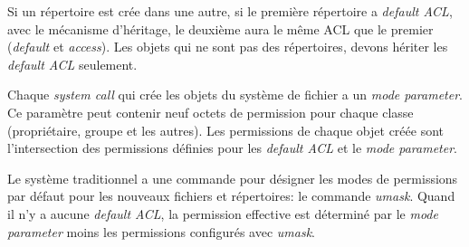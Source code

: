 Si un répertoire est crée dans une autre, si le première répertoire a \emph{default ACL}, avec le mécanisme d'héritage, le deuxième aura le même ACL que le premier (\emph{default} et \emph{access}). Les objets qui ne sont pas des répertoires, devons hériter les \emph{default ACL} seulement.
 
Chaque \emph{system call} qui crée les objets du système de fichier a un \emph{mode parameter}. Ce paramètre peut contenir neuf octets de permission pour chaque classe (propriétaire, groupe et les autres). Les permissions de chaque objet créée sont l'intersection des permissions définies pour les \emph{default ACL} et le \emph{mode parameter}.
 
Le système traditionnel a une commande pour désigner les modes de permissions par défaut pour les nouveaux fichiers et répertoires: le commande \emph{umask}. Quand il n'y a aucune \emph{default ACL}, la permission effective est déterminé par le \emph{mode parameter} moins les permissions configurés avec \emph{umask}.
 


